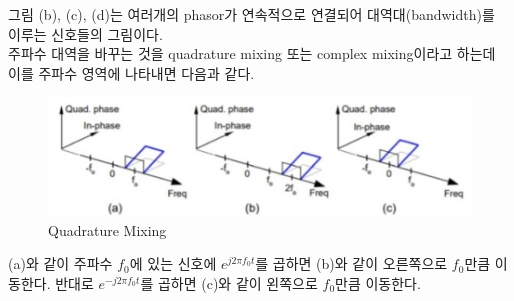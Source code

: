     그림 (b), (c), (d)는 여러개의 phasor가 연속적으로 연결되어 대역대(bandwidth)를 이루는 신호들의 그림이다. \\

    주파수 대역을 바꾸는 것을 quadrature mixing 또는 complex mixing이라고 하는데 이를 주파수 영역에 나타내면 다음과 같다.
    
    \vspace{-4mm}  
    \begin{figure}[!h]\centering
		\includegraphics[width=.75\textwidth]{image/week02/2-2-4.png}
		\caption{\small Quadrature Mixing}
		\vspace{-10pt}
    \end{figure}
    
    (a)와 같이 주파수 $f_0$에 있는 신호에 $e^{j2\pi f_0 t}$를 곱하면 (b)와 같이 오른쪽으로 $f_0$만큼 이동한다. 반대로 $e^{-j2\pi f_0 t}$를 곱하면 (c)와 같이 왼쪽으로 $f_0$만큼 이동한다.